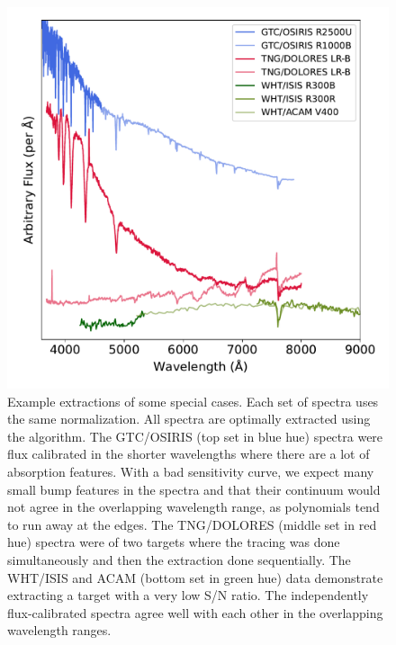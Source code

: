 \documentclass[linenumbers, twocolumn]{aastex631}
\begin{document}
\begin{figure}
    \centering
    \includegraphics[width=\columnwidth]{fig_10_use_case_plots.pdf}
    \caption{Example extractions of some special cases. Each set of spectra
    uses the same normalization. All spectra are optimally extracted using the
    \citet{1986PASP...98..609H} algorithm. The GTC/OSIRIS (top set in blue hue)
    spectra were flux calibrated in the shorter wavelengths where there are a
    lot of absorption features. With a bad sensitivity curve, we expect many
    small bump features in the spectra and that their continuum would not agree
    in the overlapping wavelength range, as polynomials tend to run away at the
    edges. The TNG/DOLORES (middle set in red hue) spectra were of two targets where
    the tracing was done simultaneously and then the extraction done
    sequentially. The WHT/ISIS and ACAM (bottom set in green hue) data demonstrate
    extracting a target with a very low S/N ratio. The independently
    flux-calibrated spectra agree well with each other in the overlapping
    wavelength ranges.}
    \label{fig:use_cases}
\end{figure}
\end{document}
